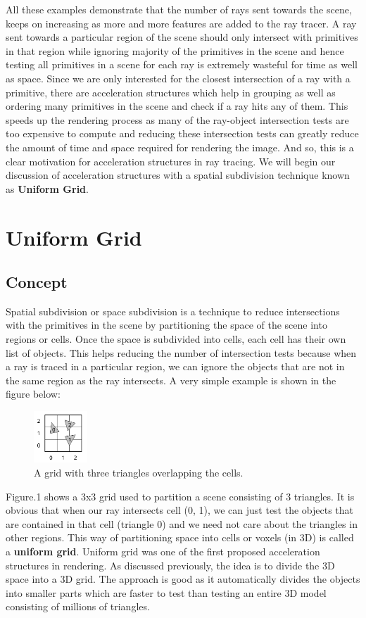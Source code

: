 \documentclass[11pt,a4paper]{article}
\begin{document}
All these examples demonstrate that the number of rays sent towards the scene, keeps on increasing as more and more features are added to the ray tracer. A ray sent towards a particular region of the scene should only intersect with primitives in that region while ignoring majority of the primitives in the scene and hence testing all primitives in a scene for each ray is extremely wasteful for time as well as space. Since we are only interested for the closest intersection of a ray with a primitive, there are acceleration structures which help in grouping as well as ordering many primitives in the scene and check if a ray hits any of them. This speeds up the rendering process as many of the ray-object intersection tests are too expensive to compute and reducing these intersection tests can greatly reduce the amount of time and space required for rendering the image. And so, this is a clear motivation for acceleration structures in ray tracing. We will begin our discussion of acceleration structures with a spatial subdivision technique known as \textbf{Uniform Grid}.

\section{Uniform Grid}
\subsection{Concept}
Spatial subdivision or space subdivision is a technique to reduce intersections with the primitives in the scene by partitioning the space of the scene into regions or cells. Once the space is subdivided into cells, each cell has their own list of objects. This helps reducing the number of intersection tests because when a ray is traced in a particular region, we can ignore the objects that are not in the same region as the ray intersects. A very simple example is shown in the figure below:
\begin{figure}[H]
	\centering
	\captionsetup{justification=centering,margin=2cm}
	\includegraphics[width=0.18\textwidth]{uniformgrids}
	\caption{A grid with three triangles overlapping the cells. \protect\cite{lagae2008compact}}
\end{figure}
Figure.1 shows a 3x3 grid used to partition a scene consisting of 3 triangles. It is obvious that when our ray intersects cell (0, 1), we can just test the objects that are contained in that cell (triangle 0) and we need not care about the triangles in other regions. This way of partitioning space into cells or voxels (in 3D) is called a \textbf{uniform grid}.
Uniform grid was one of the first proposed acceleration structures \cite{fujimoto1986arts} in rendering. As discussed previously, the idea is to divide the 3D space into a 3D grid. The approach is good as it automatically divides the objects into smaller parts which are faster to test than testing an entire 3D model consisting of millions of triangles.
\end{document}
